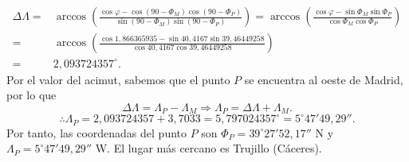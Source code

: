 \documentclass{article}
\begin{document}
\begin{sol}
\[
\begin{split}
	\Delta\Lambda = & \arccos\left(\frac{\cos\varphi - \cos\left(90-\Phi_{M}\right)\cos\left(90-\Phi_{P}\right)}{\sin\left(90-\Phi_{M}\right)\sin\left(90-\Phi_{P}\right)}\right) = \arccos\left(\frac{\cos\varphi - \sin\Phi_{M}\sin\Phi_{P}}{\cos\Phi_{M}\cos\Phi_{P}}\right) \\
	= & \arccos\left(\frac{\cos 1,866365935 - \sin40,4167 \sin39,46449258}{\cos40,4167 \cos39,46449258}\right) \\
	= & 2,093724357^{\circ}.
\end{split}
\]
Por el valor del acimut, sabemos que el punto $\displaystyle P $ se encuentra al oeste de Madrid, por lo que
\[\Delta\Lambda = \Lambda_{P}-\Lambda_{M} \Rightarrow \Lambda_{P} = \Delta\Lambda + \Lambda_{M}.\]
\[\therefore \Lambda_{P} = 2,093724357 + 3,7033 = 5,797024357^{\circ}=5^{\circ}47'49,29'' .\]
Por tanto, las coordenadas del punto $\displaystyle P $ son $\displaystyle \Phi_{P} = 39^{\circ }27'52,17'' $ N y $\displaystyle \Lambda_{P} = 5^{\circ}47'49,29''$ W. El lugar más cercano es Trujillo (Cáceres).
\end{sol}
\end{document}
